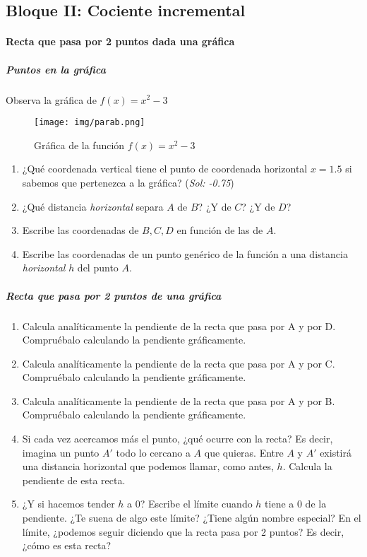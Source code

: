 \documentclass[palatino,nobuilddate,nochap]{apuntesURJC}
\begin{document}
\newpage
\subsection{Bloque II: Cociente incremental}

\paragraph{Recta que pasa por 2 puntos dada una gráfica}

\subparagraph{Puntos en la gráfica}
Observa la gráfica de $f(x)=x^2-3$
\begin{figure}[h]
\centering
\texttt{[image: img/parab.png]}
\caption{Gráfica de la función $f(x) = x^2-3$}
\label{GraficaXcuad}
\end{figure}

\begin{enumerate}
	\item ¿Qué coordenada vertical tiene el punto de coordenada horizontal $x=1.5$ si sabemos que pertenezca a la gráfica? (\textit{Sol: -0.75})
	\item ¿Qué distancia \textit{horizontal} separa $A$ de $B$? ¿Y de $C$? ¿Y de $D$?
	\item Escribe las coordenadas de $B,C,D$ en función de las de $A$.
	\item Escribe las coordenadas de un punto genérico de la función a una distancia \textit{horizontal} $h$ del punto $A$. 
\end{enumerate}


\subparagraph{Recta que pasa por 2 puntos de una gráfica}
\begin{enumerate}
	\item Calcula analíticamente la pendiente de la recta que pasa por A y por D. Compruébalo calculando la pendiente gráficamente.
	\item Calcula analíticamente la pendiente de la recta que pasa por A y por C. Compruébalo calculando la pendiente gráficamente.
	\item Calcula analíticamente la pendiente de la recta que pasa por A y por B. Compruébalo calculando la pendiente gráficamente.
	\item Si cada vez acercamos más el punto, ¿qué ocurre con la recta? Es decir, imagina un punto $A'$ todo lo cercano a $A$ que quieras. 
	Entre $A$ y $A'$ existirá una distancia horizontal que podemos llamar, como antes, $h$. Calcula la pendiente de esta recta.
	\item ¿Y si hacemos tender $h$ a 0? Escribe el límite cuando $h$ tiene a 0 de la pendiente. ¿Te suena de algo este límite? ¿Tiene algún nombre especial? 
	\subitem En el límite, ¿podemos seguir diciendo que la recta pasa por 2 puntos? Es decir, ¿cómo es esta recta? 
\end{enumerate}
\newpage
\end{document}
